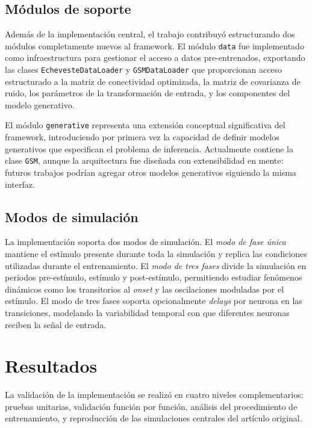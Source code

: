\documentclass{llncs}
\begin{document}
\subsection{Módulos de soporte}

Además de la implementación central, el trabajo contribuyó
estructurando dos módulos completamente nuevos al framework. El
módulo \texttt{data} fue implementado como infraestructura para
gestionar el acceso a datos pre-entrenados, exportando las clases
\texttt{EchevesteDataLoader} y \texttt{GSMDataLoader} que
proporcionan acceso estructurado a la matriz de conectividad
optimizada, la matriz de covarianza de ruido, los parámetros de la
transformación de entrada, y los componentes del modelo generativo.

El módulo \texttt{generative} representa una extensión conceptual
significativa del framework, introduciendo por primera vez la
capacidad de definir modelos generativos que especifican el problema
de inferencia. Actualmente contiene la clase \texttt{GSM}, aunque la
arquitectura fue diseñada con extensibilidad en mente: futuros
trabajos podrían agregar otros modelos generativos siguiendo la misma
interfaz.

\subsection{Modos de simulación}

La implementación soporta dos modos de simulación. El \emph{modo de
fase única} mantiene el estímulo presente durante toda la simulación
y replica las condiciones utilizadas durante el entrenamiento. El
\emph{modo de tres fases} divide la simulación en períodos
pre-estímulo, estímulo y post-estímulo, permitiendo estudiar
fenómenos dinámicos como los transitorios al \emph{onset} y las
oscilaciones moduladas por el estímulo. El modo de tres fases soporta
opcionalmente \emph{delays} por neurona en las transiciones,
modelando la variabilidad temporal con que diferentes neuronas
reciben la señal de entrada.

\section{Resultados}

La validación de la implementación se realizó en cuatro niveles
complementarios: pruebas unitarias, validación función por función,
análisis del procedimiento de entrenamiento, y reproducción de las
simulaciones centrales del artículo original.
\end{document}
